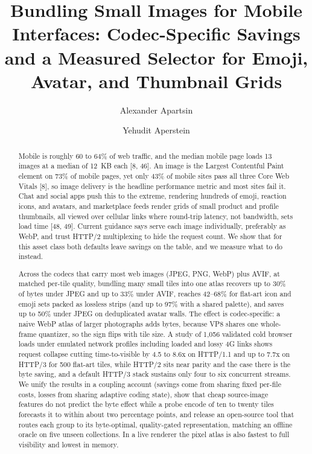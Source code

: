 \documentclass[3p,twocolumn]{elsarticle}
\begin{document}
\begin{frontmatter}
\title{\vspace*{-1.5\baselineskip}Bundling Small Images for Mobile Interfaces: Codec-Specific Savings and a Measured Selector for Emoji, Avatar, and Thumbnail Grids}
\author[hit]{Alexander Apartsin}
\author[afeka]{Yehudit Aperstein}
\address[hit]{School of Computer Science, Faculty of Sciences, Holon Institute of Technology (HIT), Holon, Israel}
\address[afeka]{Intelligent Systems, Afeka Academic College of Engineering, Tel-Aviv, Israel}
\begin{abstract}
Mobile is roughly 60 to 64\% of web traffic, and the median mobile page
loads 13 images at a median of 12~KB each [8, 46]. An image is the
Largest Contentful Paint element on 73\% of mobile pages, yet only 43\%
of mobile sites pass all three Core Web Vitals [8], so image
delivery is the headline performance metric and most sites fail it. Chat
and social apps push this to the extreme, rendering hundreds of emoji,
reaction icons, and avatars, and marketplace feeds render grids of small
product and profile thumbnails, all viewed over cellular links where
round-trip latency, not bandwidth, sets load time [48, 49]. Current
guidance says serve each image individually, preferably as WebP, and
trust HTTP/2 multiplexing to hide the request count. We show that for
this asset class both defaults leave savings on the table, and we
measure what to do instead.

Across the codecs that carry most web images (JPEG, PNG, WebP) plus
AVIF, at matched per-tile quality, bundling many small tiles into one
atlas recovers up to 30\% of bytes under JPEG and up to 33\% under AVIF,
reaches 42--68\% for flat-art icon and emoji sets packed as lossless
strips (and up to 97\% with a shared palette), and saves up to 50\%
under JPEG on deduplicated avatar walls. The effect is codec-specific: a
naive WebP atlas of larger photographs adds bytes, because VP8 shares
one whole-frame quantizer, so the sign flips with tile size. A study of
1,056 validated cold browser loads under emulated network profiles
including loaded and lossy 4G links shows request collapse cutting
time-to-visible by 4.5 to 8.6x on HTTP/1.1 and up to 7.7x on HTTP/3 for
500 flat-art tiles, while HTTP/2 sits near parity and the case there is
the byte saving, and a default HTTP/3 stack sustains only four to six
concurrent streams. We unify the results in a coupling account (savings
come from sharing fixed per-file costs, losses from sharing adaptive
coding state), show that cheap source-image features do not predict the
byte effect while a probe encode of ten to twenty tiles forecasts it to
within about two percentage points, and release an open-source tool that
routes each group to its byte-optimal, quality-gated representation,
matching an offline oracle on five unseen collections. In a live
renderer the pixel atlas is also fastest to full visibility and lowest
in memory.
\end{abstract}
\end{frontmatter}
\end{document}

